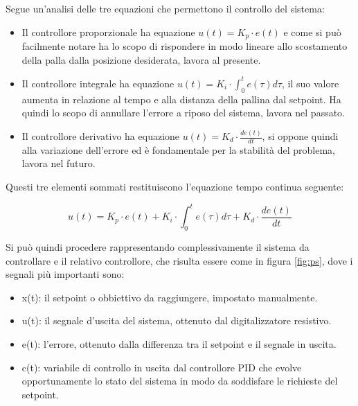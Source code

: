 \documentclass[11pt]{article}
\begin{document}
Segue un'analisi delle tre equazioni che permettono il controllo del sistema:

\begin{itemize}
\item Il controllore proporzionale ha equazione $u(t)=K_p \cdot e(t)$ e come si può facilmente notare ha lo scopo di rispondere in modo lineare allo scostamento della palla dalla posizione desiderata, lavora al presente.
\item Il controllore integrale ha equazione $u(t)=K_i \cdot \int_0^t e(\tau)d\tau$, il suo valore aumenta in relazione al tempo e alla distanza della pallina dal setpoint. Ha quindi lo scopo di annullare l'errore a riposo del sistema, lavora nel passato.
\item Il controllore derivativo ha equazione $u(t)=K_d\cdot \frac{de(t)}{dt}$, si oppone quindi alla variazione dell'errore ed è fondamentale per la stabilità del problema, lavora nel futuro.
\end{itemize}
Questi tre elementi sommati restituiscono l'equazione tempo continua seguente:

\begin{equation}\label{pidtc}
    u(t)=K_p \cdot e(t) + K_i \cdot \int_0^t e(\tau)d\tau + K_d\cdot \frac{de(t)}{dt}
\end{equation}

Si può quindi procedere rappresentando complessivamente il sistema da controllare
e il relativo controllore, che risulta essere come in figura \ref{fig:ps}, dove i segnali più importanti sono:
\begin{itemize}
\item x(t): il setpoint o obbiettivo da raggiungere, impostato manualmente.
\item u(t): il segnale d'uscita del sistema, ottenuto dal digitalizzatore resistivo.
\item e(t): l'errore, ottenuto dalla differenza tra il setpoint e il segnale in uscita.
\item c(t): variabile di controllo in uscita dal controllore PID che evolve opportunamente lo stato del sistema in modo da soddisfare le richieste del setpoint.

\end{itemize}
\end{document}
